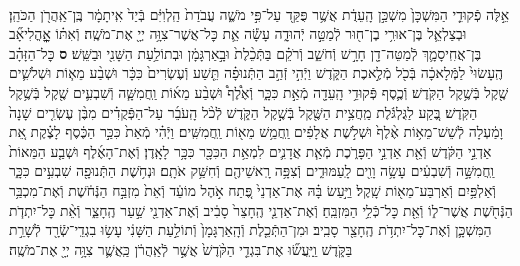 \documentclass[twoside, openany, parskip=half, 11pt]{book}
\begin{document}
\begin{footnotesize}
\begin{multicols}{2}
\\
אֵ֣לֶּה פְֿקוּדֵ֤י הַמִּשְׁכָּן֙ מִשְׁכַּ֣ן הָֽעֵדֻ֔ת אֲשֶׁ֥ר פֻּקַּ֖ד עַל־פִּ֣י מֹשֶׁ֑ה עֲבֹדַת֙ הַֽלְוִיִּ֔ם בְּֿיַד֙ אִֽיתָמָ֔ר בֶּֽן־אַֽהֲרֹ֖ן הַכֹּהֵֽן׃ וּבְצַלְאֵ֛ל בֶּן־אוּרִ֥י בֶן־ח֖וּר לְֿמַטֵּ֣ה יְֿהוּדָ֑ה עָשָׂ֕ה אֵ֛ת כׇּל־אֲשֶׁר־צִוָּ֥ה יְיָ֖ אֶת־מֹשֶֽׁה׃ וְֿאִתּ֗וֹ אׇׇׇׇׇׇׇׇׇָֽהֳלִיאָ֞ב בֶּן־אֲחִֽיסָמָ֛ךְ לְֿמַטֵּה־דָ֖ן חָרָ֣שׁ וְֿחֹשֵׁ֑ב וְֿרֹקֵ֗ם בַּתְּֿכֵ֨לֶת֙ וּבָ֣אַרְגָּמָ֔ן וּבְתוֹלַ֥עַת הַשָּׁנִ֖י וּבַשֵּֽׁשׁ׃ \textbf{ס}  כׇּל־הַזָּהָ֗ב הֶֽעָשׂוּי֙ לַמְּֿלָאכָ֔ה בְּֿכֹ֖ל מְֿלֶ֣אכֶת הַקֹּ֑דֶשׁ וַיְֿהִ֣י זְֿהַ֣ב הַתְּֿנוּפָ֗ה תֵּ֤שַׁע וְֿעֶשְׂרִים֙ כִּכָּ֔ר וּשְׁבַ֨ע מֵא֧וֹת וּשְׁלֹשִׁ֛ים שֶׁ֖קֶל בְּֿשֶׁ֥קֶל הַקֹּֽדֶשׁ׃ וְֿכֶ֛סֶף פְּֿקוּדֵ֥י הָֽעֵדָ֖ה מְֿאַ֣ת כִּכָּ֑ר וְֿאֶ֩לֶף֩ וּשְׁבַ֨ע מֵא֜וֹת וַֽחֲמִשָּׁ֧ה וְֿשִׁבְעִ֛ים שֶׁ֖קֶל בְּֿשֶׁ֥קֶל הַקֹּֽדֶשׁ׃ בֶּ֚קַע לַגֻּלְגֹּ֔לֶת מַֽחֲצִ֥ית הַשֶּׁ֖קֶל בְּֿשֶׁ֣קֶל הַקֹּ֑דֶשׁ לְֿכֹ֨ל הָֽעֹבֵ֜ר עַל־הַפְּֿקֻדִ֗ים מִבֶּ֨ן עֶשְׂרִ֤ים שָׁנָה֙ וָמַ֔עְלָה לְֿשֵׁשׁ־מֵא֥וֹת אֶ֨לֶף֙ וּשְׁלֹ֣שֶׁת אֲלָפִ֔ים וַֽחֲמֵ֥שׁ מֵא֖וֹת וַֽחֲמִשִּֽׁים׃ וַיְֿהִ֗י מְֿאַת֙ כִּכַּ֣ר הַכֶּ֔סֶף לָצֶ֗קֶת אֵ֚ת אַדְנֵ֣י הַקֹּ֔דֶשׁ וְֿאֵ֖ת אַדְנֵ֣י הַפָּרֹ֑כֶת מְֿאַ֧ת אֲדָנִ֛ים לִמְאַ֥ת הַכִּכָּ֖ר כִּכָּ֥ר לָאָֽדֶן׃  וְֿאֶת־הָאֶ֜לֶף וּשְׁבַ֤ע הַמֵּאוֹת֙ וַֽחֲמִשָּׁ֣ה וְֿשִׁבְעִ֔ים עָשָׂ֥ה וָוִ֖ים לָֽעַמּוּדִ֑ים וְֿצִפָּ֥ה רָֽאשֵׁיהֶ֖ם וְֿחִשַּׁ֥ק אֹתָֽם׃ וּנְחֹ֥שֶׁת הַתְּֿנוּפָ֖ה שִׁבְעִ֣ים כִּכָּ֑ר וְֿאַלְפַּ֥יִם וְֿאַרְבַּע־מֵא֖וֹת שָֽׁקֶל׃ וַיַּ֣עַשׂ בָּ֗הּ אֶת־אַדְנֵי֙ פֶּ֚תַח אֹ֣הֶל מוֹעֵ֔ד וְֿאֵת֙ מִזְבַּ֣ח הַנְּֿחֹ֔שֶׁת וְֿאֶת־מִכְבַּ֥ר הַנְּֿחֹ֖שֶׁת אֲשֶׁר־ל֑וֹ וְֿאֵ֖ת כׇּל־כְּֿלֵ֥י הַמִּזְבֵּֽחַ׃ וְֿאֶת־אַדְנֵ֤י הֶֽחָצֵר֙ סָבִ֔יב וְֿאֶת־אַדְנֵ֖י שַׁ֣עַר הֶֽחָצֵ֑ר וְֿאֵ֨ת כׇּל־יִתְדֹ֧ת הַמִּשְׁכָּ֛ן וְֿאֶת־כׇּל־יִתְדֹ֥ת הֶֽחָצֵ֖ר סָבִֽיב׃ וּמִן־הַתְּֿכֵ֤לֶת וְֿהָֽאַרְגָּמָן֙ וְֿתוֹלַ֣עַת הַשָּׁנִ֔י עָשׂ֥וּ בִגְדֵֽי־שְֿׂרָ֖ד לְֿשָׁרֵ֣ת בַּקֹּ֑דֶשׁ וַֽיַּֽעֲשׂ֞וּ אֶת־בִּגְדֵ֤י הַקֹּ֨דֶשׁ֙ אֲשֶׁ֣ר לְֿאַֽהֲרֹ֔ן כַּֽאֲשֶׁ֛ר צִוָּ֥ה יְיָ֖ אֶת־מֹשֶֽׁה׃


\end{multicols}
\end{footnotesize}
\end{document}
